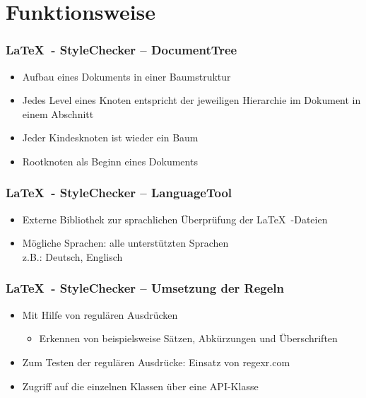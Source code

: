 \section{Funktionsweise}
\begin{frame}
\frametitle{\LaTeX~- StyleChecker -- DocumentTree}
\begin{block}{\vspace*{-3ex}}
	\begin{itemize}
		\item Aufbau eines Dokuments in einer Baumstruktur
		\item Jedes Level eines Knoten entspricht der jeweiligen Hierarchie im Dokument in einem Abschnitt
		\item Jeder Kindesknoten ist wieder ein Baum
		\item Rootknoten als Beginn eines Dokuments
	\end{itemize}
\end{block}
\end{frame}
\begin{frame}
\frametitle{\LaTeX~- StyleChecker -- LanguageTool}
\begin{block}{\vspace*{-3ex}}
	\begin{itemize}
		\item Externe Bibliothek zur sprachlichen Überprüfung der \LaTeX~-Dateien
		\item Mögliche Sprachen: alle unterstützten Sprachen \\ z.B.: Deutsch, Englisch
	\end{itemize}
\end{block}
\end{frame}
\begin{frame}
\frametitle{\LaTeX~- StyleChecker -- Umsetzung der Regeln}
\begin{block}{\vspace*{-3ex}}
	\begin{itemize}
		\item Mit Hilfe von regulären Ausdrücken
		\begin{itemize}
			\item Erkennen von beispielsweise Sätzen, Abkürzungen und Überschriften
		\end{itemize}
		\item Zum Testen der regulären Ausdrücke: Einsatz von regexr.com
		\item Zugriff auf die einzelnen Klassen über eine API-Klasse
	\end{itemize}
\end{block}
\end{frame}